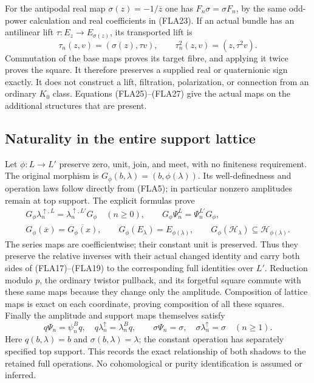 For the antipodal real map $\sigma(z)=-1/\overline z$ one has
$F_n\sigma=\sigma F_n$, by the same odd-power calculation and
real coefficients in (FLA23). If an actual bundle has an
antilinear lift $\tau:E_z\to E_{\sigma(z)}$, its transported
lift is
\begin{equation}\tag{FLA27}
 \tau_n(z,v)=(\sigma(z),\tau v),\qquad
 \tau_n^2(z,v)=(z,\tau^2v).
\end{equation}
Commutation of the base maps proves its target fibre, and applying
it twice proves the square. It therefore preserves a supplied
real or quaternionic sign exactly. It does not construct a lift,
filtration, polarization, or connection from an ordinary $K_0$
class. Equations (FLA25)--(FLA27) give the actual maps on the
additional structures that are present.

\subsection{Naturality in the entire support lattice}

Let $\phi:L\to L'$ preserve zero, unit, join, and meet, with no
finiteness requirement. The original morphism is
$G_\phi(b,\lambda)=(b,\phi(\lambda))$. Its well-definedness and
operation laws follow directly from (FLA5); in particular nonzero
amplitudes remain at top support. The explicit formulas prove
\begin{equation}\tag{FLA28}
 \begin{gathered}
 G_\phi\lambda_n^{\uparrow,L}
       =\lambda_n^{\uparrow,L'}G_\phi\quad(n\ge0),\qquad
 G_\phi\Psi_n^L=\Psi_n^{L'}G_\phi,\\
 G_\phi(\overline x)=\overline{G_\phi(x)},\qquad
 G_\phi(E_\lambda)=E_{\phi(\lambda)},\qquad
 G_\phi(\mathcal H_\lambda)\subseteq
                         \mathcal H_{\phi(\lambda)}.
 \end{gathered}
\end{equation}
The series maps are coefficientwise; their constant unit is
preserved. Thus they preserve the relative inverses with their
actual changed identity and carry both sides of (FLA17)--(FLA19)
to the corresponding full identities over $L'$. Reduction modulo
$p$, the ordinary twistor pullback, and its forgetful square commute
with these same maps because they change only the amplitude.
Composition of lattice maps is exact on each coordinate, proving
composition of all these squares. Finally the amplitude and support
maps themselves satisfy
\begin{equation}\tag{FLA29}
 q\Psi_n=\psi_n^Bq,\quad q\lambda_n^{\uparrow}=\lambda_n^Bq,
 \qquad \sigma\Psi_n=\sigma,\quad
 \sigma\lambda_n^{\uparrow}=\sigma\quad(n\ge1).
\end{equation}
Here $q(b,\lambda)=b$ and $\sigma(b,\lambda)=\lambda$; the
constant operation has separately specified top support. This
records the exact relationship of both shadows to the retained
full operations. No cohomological or purity identification is
assumed or inferred.

